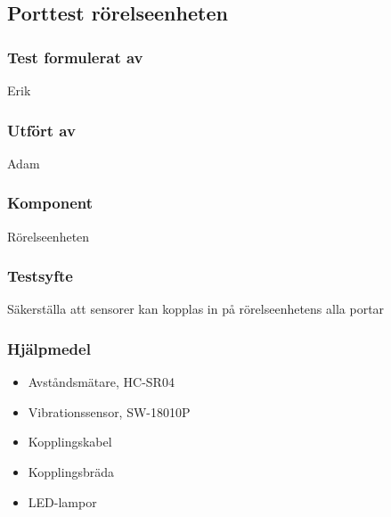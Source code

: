 \clearpage
\subsection{Porttest rörelseenheten}
\label{test:PortMotion}

\setlength{\columnsep}{1cm}




\begin{multicols}{2}
\subsubsection*{Test formulerat av}
Erik

\subsubsection*{Utfört av}
Adam


\end{multicols}
\subsubsection*{Komponent}
Rörelseenheten


\subsubsection*{Testsyfte}
Säkerställa att sensorer kan kopplas in på rörelseenhetens alla portar

\subsubsection*{Hjälpmedel}
\begin{itemize}
	\item Avståndsmätare, HC-SR04
	\item Vibrationssensor, SW-18010P
	\item Kopplingskabel
	\item Kopplingsbräda
	\item LED-lampor
\end{itemize}



